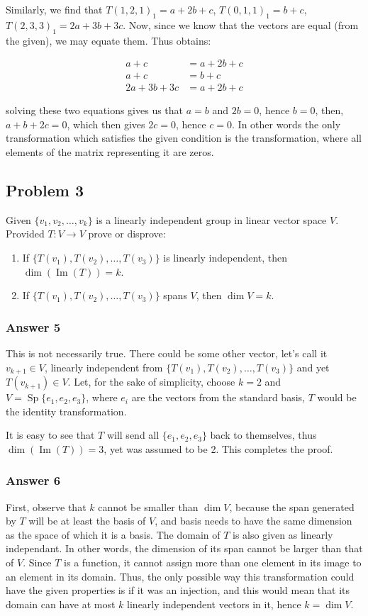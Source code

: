 \documentclass[fleqn]{article}
\DeclareMathOperator{\Sp}{Sp}
\DeclareMathOperator{\Dim}{dim}
\DeclareMathOperator{\Image}{Im}
\begin{document}
Similarly, we find that $T(1,2,1)_1=a+2b+c$, $T(0,1,1)_1=b+c$,
$T(2,3,3)_1=2a+3b+3c$.  Now, since we know that the vectors are equal (from
the given), we may equate them.  Thus obtains:

\begin{align*}
  a+c      &= a+2b+c \\
  a+c      &= b+c \\
  2a+3b+3c &= a+2b+c
\end{align*}

solving these two equations gives us that $a=b$ and $2b=0$, hence $b=0$,
then, $a+b+2c=0$, which then gives $2c=0$, hence $c=0$.  In other words
the only transformation which satisfies the given condition is the
transformation, where all elements of the matrix representing it are zeros.
\subsection{Problem 3}
\label{sec-1-3}
Given $\{v_1, v_2, \ldots, v_k\}$ is a linearly independent group in linear
vector space $V$.  Provided $T:V\to V$ prove or disprove:

\begin{enumerate}
\item If $\{T(v_1), T(v_2), \ldots, T(v_3)\}$ is linearly independent, then
      $\Dim(\Image(T))=k$.
\item If $\{T(v_1), T(v_2), \ldots, T(v_3)\}$ spans $V$, then $\dim{V}=k$.
\end{enumerate}

\subsubsection{Answer 5}
\label{sec-1-3-1}
This is not necessarily true.  There could be some other vector, let's call
it $v_{k+1} \in V$, linearly independent from
$\{T(v_1), T(v_2), \ldots, T(v_3)\}$ and yet $T(v_{k+1}) \in V$.  Let, for the
sake of simplicity, choose $k=2$ and $V=\Sp\{e_1,e_2,e_3\}$, where $e_i$ are
the vectors from the standard basis, $T$ would be the identity transformation.

It is easy to see that $T$ will send all $\{e_1,e_2,e_3\}$ back to themselves,
thus $\Dim(\Image(T))=3$, yet was assumed to be 2.  This completes the proof.
\subsubsection{Answer 6}
\label{sec-1-3-2}
First, observe that $k$ cannot be smaller than $\Dim{V}$, because the span
generated by $T$ will be at least the basis of $V$, and basis needs to have the
same dimension as the space of which it is a basis.  The domain of $T$ is also
given as linearly independant.  In other words, the dimension of its span
cannot be larger than that of $V$.  Since $T$ is a function, it cannot assign
more than one element in its image to an element in its domain.  Thus, the only
possible way this transformation could have the given properties is if it was
an injection, and this would mean that its domain can have at most $k$ linearly
independent vectors in it, hence $k=\dim{V}$.
\end{document}
